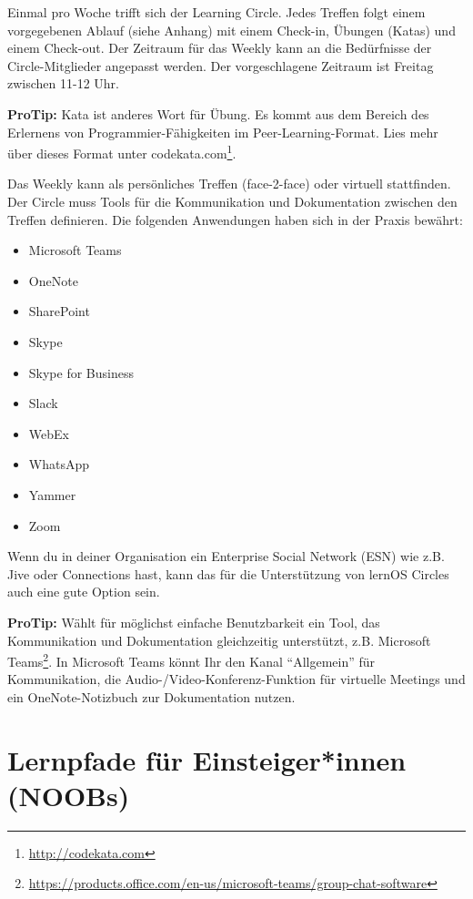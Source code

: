 \documentclass[
  ngerman,
  paper=a4,
,captions=tableheading
]{scrartcl}
\DeclareRobustCommand{\href}[2]{#2\footnote{\url{#1}}}
\providecommand{\tightlist}{%
  \setlength{\itemsep}{0pt}\setlength{\parskip}{0pt}}
\begin{document}
Einmal pro Woche trifft sich der Learning Circle. Jedes Treffen folgt
einem vorgegebenen Ablauf (siehe Anhang) mit einem Check-in, Übungen
(Katas) und einem Check-out. Der Zeitraum für das Weekly kann an die
Bedürfnisse der Circle-Mitglieder angepasst werden. Der vorgeschlagene
Zeitraum ist Freitag zwischen 11-12 Uhr.

\textbf{ProTip:} Kata ist anderes Wort für Übung. Es kommt aus dem
Bereich des Erlernens von Programmier-Fähigkeiten im
Peer-Learning-Format. Lies mehr über dieses Format unter
\href{http://codekata.com}{codekata.com}.

Das Weekly kann als persönliches Treffen (face-2-face) oder virtuell
stattfinden. Der Circle muss Tools für die Kommunikation und
Dokumentation zwischen den Treffen definieren. Die folgenden Anwendungen
haben sich in der Praxis bewährt:

\begin{itemize}
\tightlist
\item
  Microsoft Teams
\item
  OneNote
\item
  SharePoint
\item
  Skype
\item
  Skype for Business
\item
  Slack
\item
  WebEx
\item
  WhatsApp
\item
  Yammer
\item
  Zoom
\end{itemize}

Wenn du in deiner Organisation ein Enterprise Social Network (ESN) wie
z.B. Jive oder Connections hast, kann das für die Unterstützung von
lernOS Circles auch eine gute Option sein.

\textbf{ProTip:} Wählt für möglichst einfache Benutzbarkeit ein Tool,
das Kommunikation und Dokumentation gleichzeitig unterstützt, z.B.
\href{https://products.office.com/en-us/microsoft-teams/group-chat-software}{Microsoft
Teams}. In Microsoft Teams könnt Ihr den Kanal ``Allgemein'' für
Kommunikation, die Audio-/Video-Konferenz-Funktion für virtuelle
Meetings und ein OneNote-Notizbuch zur Dokumentation nutzen.

\hypertarget{lernpfade-fuxfcr-einsteigerinnen-noobs}{%
\section{Lernpfade für Einsteiger*innen
(NOOBs)}\label{lernpfade-fuxfcr-einsteigerinnen-noobs}}
\end{document}

